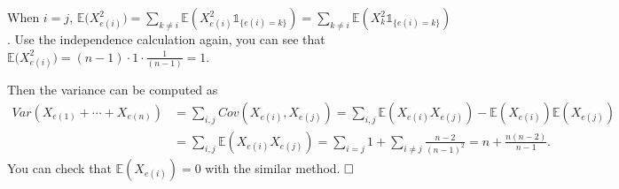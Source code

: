 \documentclass[12pt]{article}
\begin{document}
When $i=j$, $\mathbb{E}\big(X_{e(i)}^2\big)=\sum_{k\neq i}\mathbb{E}(X_{e(i)}^2\mathds{1}_{\{e(i)=k\}})=\sum_{k\neq i}\mathbb{E}(X_k^2\mathds{1}_{\{e(i)=k\}})$. Use the independence calculation again, you can see that $\mathbb{E}\big(X_{e(i)}^2\big)=(n-1)\cdot1\cdot\frac{1}{(n-1)}=1$.

Then the variance can be computed as
\begin{equation*}
\begin{aligned}
Var(X_{e(1)}+\cdots+X_{e(n)}) &= \sum_{i,j}Cov(X_{e(i)}, X_{e(j)})=\sum_{i,j}\mathbb{E}(X_{e(i)}X_{e(j)})-\mathbb{E}(X_{e(i)})\mathbb{E}(X_{e(j)}) \\&
=\sum_{i,j}\mathbb{E}(X_{e(i)}X_{e(j)})
=\sum_{i=j}1+\sum_{i\neq j}\frac{n-2}{(n-1)^2}=n+\frac{n(n-2)}{n-1}.
\end{aligned}
\end{equation*}
You can check that $\mathbb{E}(X_{e(i)})=0$ with the similar method.
$\hspace{\fill}\square$
\end{document}
